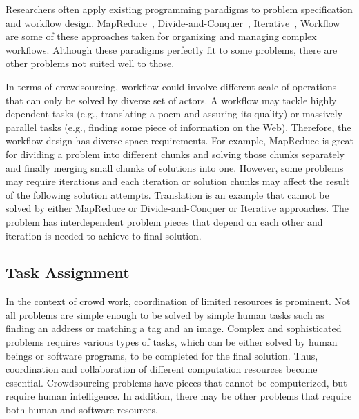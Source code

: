 Researchers often apply existing programming paradigms to problem specification 
and workflow design. MapReduce~\cite{Kittur2011, Ahmad2011}, 
Divide-and-Conquer~\cite{Kulkarni2012}, 
Iterative~\cite{Little2009}, 
Workflow ~\cite{Kokciyan2012} are some of these approaches taken for 
organizing and managing complex workflows. Although these paradigms 
perfectly fit to some problems, there are other problems not suited well to those. 

In terms of crowdsourcing, workflow could involve different scale of operations that 
can only be solved by diverse set of actors. A workflow may tackle highly dependent 
tasks (e.g., translating a poem and assuring its quality) or massively parallel 
tasks (e.g., finding some piece of information on the Web). Therefore, the workflow 
design has diverse space requirements. For example, MapReduce is great for 
dividing a problem into different chunks and solving those chunks separately and 
finally merging small chunks of solutions into one. However, some problems may 
require iterations and each iteration or solution chunks may affect the result of 
the following solution attempts. Translation is an example that cannot be solved 
by either MapReduce or Divide-and-Conquer or Iterative approaches. The problem 
has interdependent problem pieces that depend on each other and iteration is 
needed to achieve to final solution.

\subsection{Task Assignment}
In the context of crowd work, coordination of limited resources is prominent. 
Not all problems are simple enough to be solved by simple human tasks such as 
finding an address or matching a tag and an image. Complex and sophisticated 
problems requires various types of tasks, which can be either solved by human 
beings or software programs, to be completed for the final solution. Thus, 
coordination and collaboration of different computation resources become
essential. Crowdsourcing problems  
have pieces that cannot be computerized, but require human intelligence. In 
addition, there may be other problems that require both human and software 
resources.

